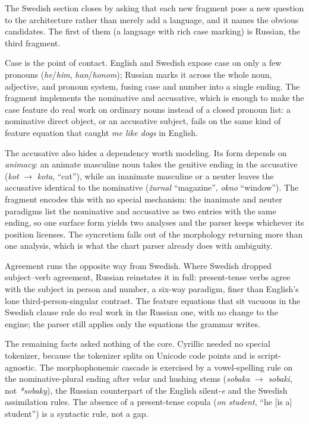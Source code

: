 \documentclass[11pt]{article}
\theoremstyle{definition}
\theoremstyle{plain}
\theoremstyle{remark}
\begin{document}
The Swedish section closes by asking that each new fragment pose a new question to the
architecture rather than merely add a language, and it names the obvious candidates. The
first of them (a language with rich case marking) is Russian, the third fragment.

Case is the point of contact. English and Swedish expose case on only a few pronouns
(\emph{he}/\emph{him}, \emph{han}/\emph{honom}); Russian marks it across the whole noun,
adjective, and pronoun system, fusing case and number into a single ending. The fragment
implements the nominative and accusative, which is enough to make the case feature do real
work on ordinary nouns instead of a closed pronoun list: a nominative direct object, or an
accusative subject, fails on the same kind of feature equation that caught \emph{me like
dogs} in English.

The accusative also hides a dependency worth modeling. Its form depends on \emph{animacy}:
an animate masculine noun takes the genitive ending in the accusative (\emph{kot} $\to$
\emph{kota}, ``cat''), while an inanimate masculine or a neuter leaves the accusative
identical to the nominative (\emph{\v{z}urnal} ``magazine'', \emph{okno} ``window''). The
fragment encodes this with no special mechanism: the inanimate and neuter paradigms list
the nominative and accusative as two entries with the same ending, so one surface form
yields two analyses and the parser keeps whichever its position licenses. The syncretism
falls out of the morphology returning more than one analysis, which is what the chart
parser already does with ambiguity.

Agreement runs the opposite way from Swedish. Where Swedish dropped subject--verb
agreement, Russian reinstates it in full: present-tense verbs agree with the subject in
person and number, a six-way paradigm, finer than English's lone third-person-singular
contrast. The feature equations that sit vacuous in the Swedish clause rule do real work in
the Russian one, with no change to the engine; the parser still applies only the equations
the grammar writes.

The remaining facts asked nothing of the core. Cyrillic needed no special tokenizer,
because the tokenizer splits on Unicode code points and is script-agnostic. The
morphophonemic cascade is exercised by a vowel-spelling rule on the nominative-plural
ending after velar and hushing stems (\emph{sobaka} $\to$ \emph{sobaki}, not
\emph{*sobaky}), the Russian counterpart of the English silent-\emph{e} and the Swedish
assimilation rules. The absence of a present-tense copula (\emph{on student}, ``he [is a]
student'') is a syntactic rule, not a gap.
\end{document}
